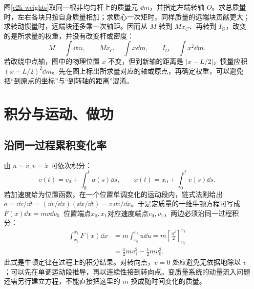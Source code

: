 

图\ref{c2k-weights}取同一根非均匀杆上的质量元 $\dd m$，并指定左端转轴 $O$。求总质量时，左右各块只按自身质量相加；求质心一次矩时，同样质量的远端块贡献更大；求转动惯量时，远端块还多乘一次轴距。因而从 $M$ 转到 $Mx_C$、再转到 $I_O$，改变的是所求量的权重，并没有改变杆或密度：
\[
 M=\int\dd m,\qquad Mx_C=\int x\dd m,\qquad I_O=\int x^2\dd m.
\]
若改绕中点轴，图中的物理位置 $x$ 不变，但到新轴的距离是 $|x-L/2|$，惯量应积 $(x-L/2)^2\dd m$。先在图上标出所求量对应的轴或原点，再确定权重，可以避免把“到原点的坐标”与“到转轴的距离”混淆。






\section{积分与运动、做功}
\subsection{沿同一过程累积变化率}
由 $a=\dot v,v=\dot x$ 可依次积分：
\[
 v(t)=v_0+\int_0^t a(s)\dd s,\qquad
 x(t)=x_0+\int_0^t v(s)\dd s.
\]
若加速度给为位置函数，在一个位置单调变化的运动段内，链式法则给出
$a=\dd v/\dd t=(\dd v/\dd x)(\dd x/\dd t)=v\,\dd v/\dd x$。于是定质量的一维牛顿方程可写成$F(x)\dd x=m v\dd v$。位置端点$x_0,x_1$对应速度端点$v_0,v_1$，两边必须沿同一过程积分：
\begin{align*}
\int_{x_0}^{x_1}F(x)\dd x
&=m\int_{v_0}^{v_1}u\dd u
=m\left[\frac{u^2}{2}\right]_{v_0}^{v_1}\\
&=\frac12mv_1^2-\frac12mv_0^2.
\end{align*}
此式是牛顿定律在过程上的积分结果。对转向点，$v=0$ 处应避免无依据地除以 $v$；可以先在单调运动段推导，再以连续性接到转向点。变质量系统的动量流入问题还需另行建立方程，不能直接把这里的 $m$ 换成随时间变化的质量。


